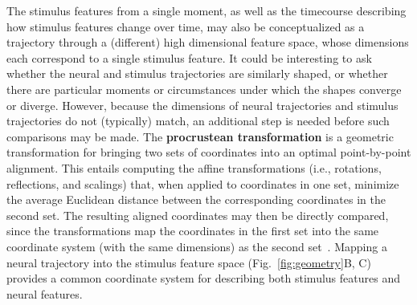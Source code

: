 \documentclass[runningheads]{llncs}
\begin{document}
The stimulus features from a single moment, as well as the timecourse
describing how stimulus features change over time, may also be
conceptualized as a trajectory through a (different) high dimensional
feature space, whose dimensions each correspond to a single stimulus
feature.  It could be interesting to ask whether the neural and
stimulus trajectories are similarly shaped, or whether there are
particular moments or circumstances under which the shapes converge or
diverge.  However, because the dimensions of neural trajectories and
stimulus trajectories do not (typically) match, an additional step is
needed before such comparisons may be made.  The \textbf{procrustean
  transformation} is a geometric transformation for bringing
two sets of coordinates into an optimal point-by-point alignment.
This entails computing the affine transformations
(i.e., rotations, reflections, and scalings) that, when applied to
coordinates in one set, minimize the average Euclidean distance
between the corresponding coordinates in the second set.  The
resulting aligned coordinates may then be directly compared, since the
transformations map the coordinates in the first set into the same
coordinate system (with the same dimensions) as the second
set~\citep{HaxbEtal11}.  Mapping a neural trajectory into the stimulus
feature space (Fig.~\ref{fig:geometry}B, C) provides a common coordinate
system for describing both stimulus features and neural features.
\end{document}
